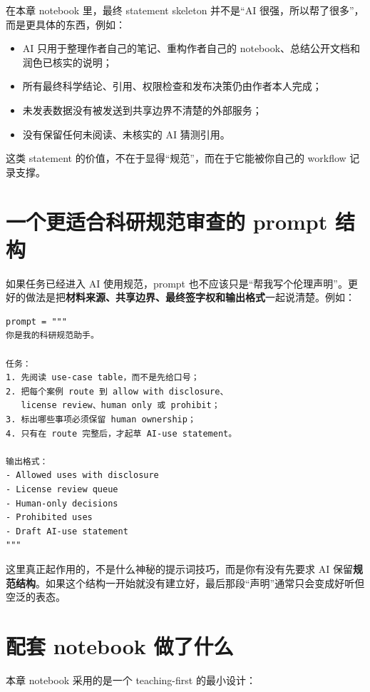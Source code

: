在本章 notebook 里，最终 statement skeleton 并不是“AI 很强，所以帮了很多”，而是更具体的东西，例如：

\begin{itemize}
    \item AI 只用于整理作者自己的笔记、重构作者自己的 notebook、总结公开文档和润色已核实的说明；
    \item 所有最终科学结论、引用、权限检查和发布决策仍由作者本人完成；
    \item 未发表数据没有被发送到共享边界不清楚的外部服务；
    \item 没有保留任何未阅读、未核实的 AI 猜测引用。
\end{itemize}

这类 statement 的价值，不在于显得“规范”，而在于它能被你自己的 workflow 记录支撑。

\section{一个更适合科研规范审查的 prompt 结构}

如果任务已经进入 AI 使用规范，prompt 也不应该只是“帮我写个伦理声明”。更好的做法是把\textbf{材料来源、共享边界、最终签字权和输出格式}一起说清楚。例如：

\begin{examplebox}
\begin{lstlisting}[style=pythonstyle]
prompt = """
你是我的科研规范助手。

任务：
1. 先阅读 use-case table，而不是先给口号；
2. 把每个案例 route 到 allow with disclosure、
   license review、human only 或 prohibit；
3. 标出哪些事项必须保留 human ownership；
4. 只有在 route 完整后，才起草 AI-use statement。

输出格式：
- Allowed uses with disclosure
- License review queue
- Human-only decisions
- Prohibited uses
- Draft AI-use statement
"""
\end{lstlisting}
\end{examplebox}

这里真正起作用的，不是什么神秘的提示词技巧，而是你有没有先要求 AI 保留\textbf{规范结构}。如果这个结构一开始就没有建立好，最后那段“声明”通常只会变成好听但空泛的表态。

\section{配套 notebook 做了什么}

本章 notebook 采用的是一个 teaching-first 的最小设计：

